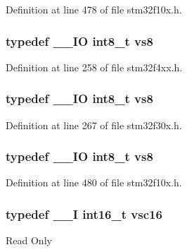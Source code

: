 Definition at line 478 of file stm32f10x.\-h.

\hypertarget{group___exported__types_ga9e5a203f00d2906af9466f68b4e72277}{
\subsubsection[{vs8}]{\setlength{\rightskip}{0pt plus 5cm}typedef \-\_\-\-\_\-\-I\-O {\bf int8\-\_\-t} {\bf vs8}}}\label{group___exported__types_ga9e5a203f00d2906af9466f68b4e72277}


Definition at line 258 of file stm32f4xx.\-h.

\hypertarget{group___exported__types_ga9e5a203f00d2906af9466f68b4e72277}{
\subsubsection[{vs8}]{\setlength{\rightskip}{0pt plus 5cm}typedef \-\_\-\-\_\-\-I\-O {\bf int8\-\_\-t} {\bf vs8}}}\label{group___exported__types_ga9e5a203f00d2906af9466f68b4e72277}


Definition at line 267 of file stm32f30x.\-h.

\hypertarget{group___exported__types_ga9e5a203f00d2906af9466f68b4e72277}{
\subsubsection[{vs8}]{\setlength{\rightskip}{0pt plus 5cm}typedef \-\_\-\-\_\-\-I\-O {\bf int8\-\_\-t} {\bf vs8}}}\label{group___exported__types_ga9e5a203f00d2906af9466f68b4e72277}


Definition at line 480 of file stm32f10x.\-h.

\hypertarget{group___exported__types_ga369ae0177b957e5afa7c1e62312f97c3}{
\subsubsection[{vsc16}]{\setlength{\rightskip}{0pt plus 5cm}typedef \-\_\-\-\_\-\-I {\bf int16\-\_\-t} {\bf vsc16}}}\label{group___exported__types_ga369ae0177b957e5afa7c1e62312f97c3}
Read Only 

